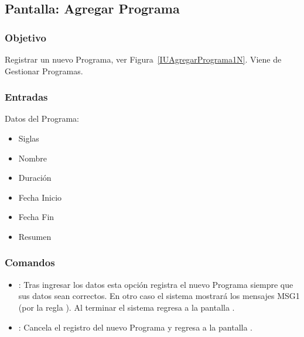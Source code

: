 \subsection{Pantalla: Agregar Programa}

\subsubsection{Objetivo}
Registrar un nuevo Programa, ver Figura~\ref{IUAgregarPrograma1N}. Viene de Gestionar Programas.


\subsubsection{Entradas}
Datos del Programa:
\begin{itemize}
	\item Siglas
	\item Nombre
	\item Duración
	\item Fecha Inicio
	\item Fecha Fin
	\item Resumen
\end{itemize}

\subsubsection{Comandos}
\begin{itemize}
	\item {}: Tras ingresar los datos esta opción registra el nuevo Programa siempre que sus datos sean correctos. En otro caso el sistema mostrará los mensajes MSG1 (por la regla ). Al terminar el sistema regresa a la pantalla .
	\item {}: Cancela el registro del nuevo Programa y regresa a la pantalla .
\end{itemize}



